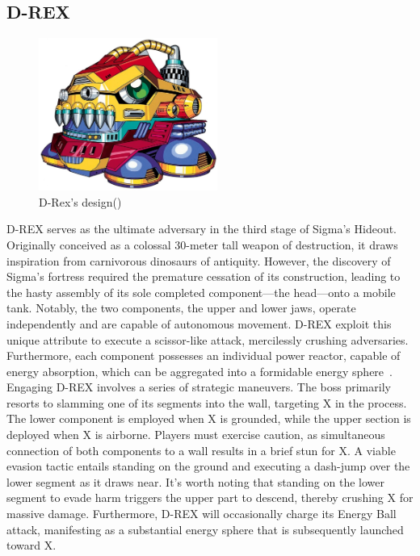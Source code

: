 \subsection{D-REX}
\begin{figure}[htp]
	\centering
	\includegraphics[height=5cm]{figures/X1/Sigma_stages/Drex.jpg}
	\caption{D-Rex's design(\cite{book:MMX_Complete_art})}
\end{figure}
D-REX serves as the ultimate adversary in the third stage of Sigma's Hideout. Originally conceived as a colossal 30-meter tall weapon of destruction, it draws inspiration from carnivorous dinosaurs of antiquity. However, the discovery of Sigma's fortress required the premature cessation of its construction, leading to the hasty assembly of its sole completed component—the head—onto a mobile tank. Notably, the two components, the upper and lower jaws, operate independently and are capable of autonomous movement. D-REX exploit this unique attribute to execute a scissor-like attack, mercilessly crushing adversaries. Furthermore, each component possesses an individual power reactor, capable of energy absorption, which can be aggregated into a formidable energy sphere~\cite{wayback:X_resources}.
Engaging D-REX involves a series of strategic maneuvers. The boss primarily resorts to slamming one of its segments into the wall, targeting X in the process. The lower component is employed when X is grounded, while the upper section is deployed when X is airborne. Players must exercise caution, as simultaneous connection of both components to a wall results in a brief stun for X. A viable evasion tactic entails standing on the ground and executing a dash-jump over the lower segment as it draws near. It's worth noting that standing on the lower segment to evade harm triggers the upper part to descend, thereby crushing X for massive damage. Furthermore, D-REX will occasionally charge its Energy Ball attack, manifesting as a substantial energy sphere that is subsequently launched toward X. 
